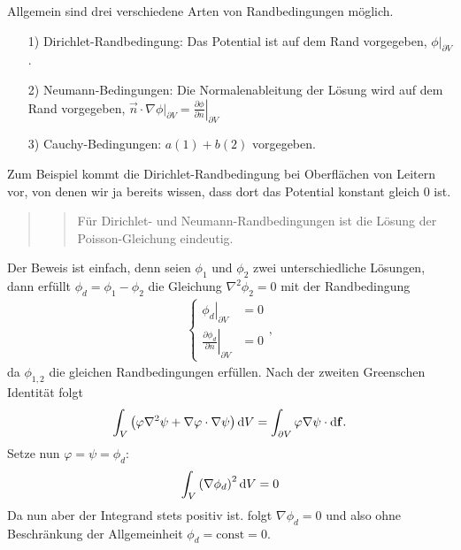 Allgemein sind drei verschiedene Arten von Randbedingungen möglich. \begin{enumerate}[1)]


	\item[1)] Dirichlet-Randbedingung: Das Potential ist auf dem Rand vorgegeben, $\left.\hspace{0pt}\phi \right| _{\partial V}$.

	\item[2)] Neumann-Bedingungen: Die Normalenableitung der Lösung wird auf dem Rand vorgegeben, $\vec {n}\cdot \left.\hspace{0pt}\nabla \phi \right| _{\partial V}=\left.\frac{\partial \phi }{\partial n}\right| _{\partial V}$

	\item[3)] Cauchy-Bedingungen: $a\left(1\right)+b\left(2\right)$ vorgegeben.

\end{enumerate}
Zum Beispiel kommt die Dirichlet-Randbedingung bei Oberflächen von Leitern vor, von denen wir ja bereits wissen, dass dort das Potential konstant gleich $0$ ist.
\begin{quotation}
	\begin{quote}
		Für Dirichlet- und Neumann-Randbedingungen ist die Lösung der Poisson-Gleichung eindeutig.
	\end{quote}
\end{quotation}
Der Beweis ist einfach, denn seien $\phi _{1}$ und $\phi _{2}$ zwei unterschiedliche Lösungen, dann erfüllt $\phi _{d}=\phi _{1}-\phi _{2}$ die Gleichung $\nabla ^{2}\phi _{2}=0$ mit der Randbedingung
\begin{align*}
	\begin{cases} \left.\phi _{d}\right| _{\partial V}                             & =0 \\
              \left.\frac{\partial \phi _{d}}{\partial n}\right| _{\partial V} & =0
	\end{cases} ,
\end{align*}
da $\phi _{1,2}$ die gleichen Randbedingungen erfüllen. Nach der zweiten Greenschen Identität folgt
\begin{equation*}
	\int _{V}\left(\varphi \nabla ^{2}\psi +\nabla \varphi \cdot \nabla \psi \right)\text{d} V=\int _{\partial V}\varphi \nabla \psi \cdot \text{d} \mathbf{f}.
\end{equation*}
Setze nun $\varphi =\psi =\phi _{d}$:
\begin{equation*}
	\int _{V}\left(\nabla \phi _{d}\right)^{2}\text{d} V=0
\end{equation*}
Da nun aber der Integrand stets positiv ist. folgt $\nabla \phi _{d}=0$ und also ohne Beschränkung der Allgemeinheit $\phi _{d}=\text{const}=0$.

